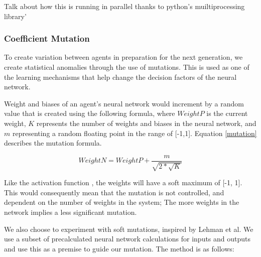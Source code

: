 \documentclass[12pt,a4paper]{article}
\begin{document}
            Talk about how this is running in parallel thanks to python's muiltiprocessing library'
            
        \subsubsection{Coefficient Mutation} \label{coefficient_mutation}

            To create variation between agents in preparation for the next generation, we create statistical anomalies through the use of mutations. This is used as one of the learning mechanisms that help change the decision factors of the neural network.

            Weight and biases of an agent's neural network would increment by a random value that is created using the following formula, where $WeightP$ is the current weight, $K$ represents the number of weights and biases in the neural network, and $m$ representing a random floating point in the range of [-1,1]. Equation \ref{mutation} describes the mutation formula.

            \begin{equation} \label{mutation}
                WeightN = WeightP + \frac{m}{\sqrt{2 * \sqrt{K} }}
            \end{equation}

            Like the activation function
            , the weights
            will have a soft maximum of [-1, 1]. This would consequently mean that the mutation is not controlled, and dependent on the number of weights in the system; The more weights in the network implies a less significant mutation.
            
             We also choose to experiment with soft mutations, inspired by Lehman et al. \cite{lehman_safe_2017} We use a subset of precalculated neural network calculations for inputs and outputs and use this as a premise to guide our mutation. The method is as follows:
             
\end{document}
